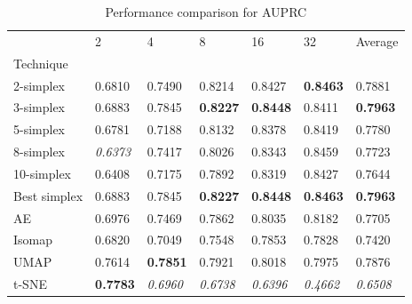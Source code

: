 \begin{table}
\caption{Performance comparison for AUPRC}
\label{tab:results_auprc}
\begin{center}
\begin{tabular}{lllllll}
\toprule
 & 2 & 4 & 8 & 16 & 32 & Average \\
Technique &  &  &  &  &  &  \\
\midrule
2-simplex & 0.6810 & 0.7490 & 0.8214 & 0.8427 & \textbf{0.8463} & 0.7881 \\
3-simplex & 0.6883 & 0.7845 & \textbf{0.8227} & \textbf{0.8448} & 0.8411 & \textbf{0.7963} \\
5-simplex & 0.6781 & 0.7188 & 0.8132 & 0.8378 & 0.8419 & 0.7780 \\
8-simplex & \textit{0.6373} & 0.7417 & 0.8026 & 0.8343 & 0.8459 & 0.7723 \\
10-simplex & 0.6408 & 0.7175 & 0.7892 & 0.8319 & 0.8427 & 0.7644 \\
Best simplex & 0.6883 & 0.7845 & \textbf{0.8227} & \textbf{0.8448} & \textbf{0.8463} & \textbf{0.7963} \\
AE & 0.6976 & 0.7469 & 0.7862 & 0.8035 & 0.8182 & 0.7705 \\
Isomap & 0.6820 & 0.7049 & 0.7548 & 0.7853 & 0.7828 & 0.7420 \\
UMAP & 0.7614 & \textbf{0.7851} & 0.7921 & 0.8018 & 0.7975 & 0.7876 \\
t-SNE & \textbf{0.7783} & \textit{0.6960} & \textit{0.6738} & \textit{0.6396} & \textit{0.4662} & \textit{0.6508} \\
\bottomrule
\end{tabular}
\end{center}
\end{table}


